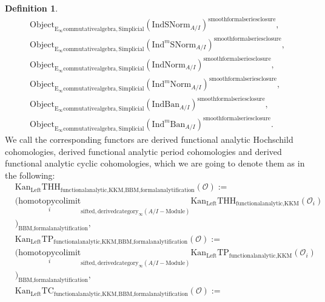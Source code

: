 \documentclass[11pt]{book}
\theoremstyle{definition}
\newtheorem{definition}[theorem]{Definition}
\numberwithin{equation}{section}
\begin{document}
\begin{definition}
\begin{align}
\mathrm{Object}_{\mathrm{E}_\infty\mathrm{commutativealgebra},\mathrm{Simplicial}}(\mathrm{IndSNorm}_{A/I})^{\mathrm{smoothformalseriesclosure}},\\
\mathrm{Object}_{\mathrm{E}_\infty\mathrm{commutativealgebra},\mathrm{Simplicial}}(\mathrm{Ind}^m\mathrm{SNorm}_{A/I})^{\mathrm{smoothformalseriesclosure}},\\
\mathrm{Object}_{\mathrm{E}_\infty\mathrm{commutativealgebra},\mathrm{Simplicial}}(\mathrm{IndNorm}_{A/I})^{\mathrm{smoothformalseriesclosure}},\\
\mathrm{Object}_{\mathrm{E}_\infty\mathrm{commutativealgebra},\mathrm{Simplicial}}(\mathrm{Ind}^m\mathrm{Norm}_{A/I})^{\mathrm{smoothformalseriesclosure}},\\
\mathrm{Object}_{\mathrm{E}_\infty\mathrm{commutativealgebra},\mathrm{Simplicial}}(\mathrm{IndBan}_{A/I})^{\mathrm{smoothformalseriesclosure}},\\
\mathrm{Object}_{\mathrm{E}_\infty\mathrm{commutativealgebra},\mathrm{Simplicial}}(\mathrm{Ind}^m\mathrm{Ban}_{A/I})^{\mathrm{smoothformalseriesclosure}}.
\end{align}
We call the corresponding functors are derived functional analytic Hochschild cohomologies, derived functional analytic period cohomologies and derived functional analytic cyclic cohomologies, which we are going to denote them as in the following:
\begin{align}
	&\mathrm{Kan}_{\mathrm{Left}}\mathrm{THH}_{\text{functionalanalytic,KKM},\text{BBM,formalanalytification}}(\mathcal{O}):=\\
	&(\underset{i}{\text{homotopycolimit}}_{\text{sifted},\text{derivedcategory}_{\infty}(A/I-\text{Module})}\mathrm{Kan}_{\mathrm{Left}}\mathrm{THH}_{\text{functionalanalytic,KKM}}(\mathcal{O}_i)\\
	&)_\text{BBM,formalanalytification},\\
	&\mathrm{Kan}_{\mathrm{Left}}\mathrm{TP}_{\text{functionalanalytic,KKM},\text{BBM,formalanalytification}}(\mathcal{O}):=\\
	&(\underset{i}{\text{homotopycolimit}}_{\text{sifted},\text{derivedcategory}_{\infty}(A/I-\text{Module})}\mathrm{Kan}_{\mathrm{Left}}\mathrm{TP}_{\text{functionalanalytic,KKM}}(\mathcal{O}_i)\\
	&)_\text{BBM,formalanalytification},\\
	&\mathrm{Kan}_{\mathrm{Left}}\mathrm{TC}_{\text{functionalanalytic,KKM},\text{BBM,formalanalytification}}(\mathcal{O}):=\\

\end{align}
\end{definition}
\end{document}
